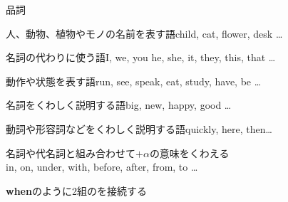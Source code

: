 \documentclass[aspectratio=169,xcolor={dvipsnames,table}]{beamer}
\begin{document}
\begin{frame}[plain,label=basic]{品詞}
 
\begin{description}
 \item[名詞] 人、動物、植物やモノの名前を表す語\hfill{\small child, cat, flower, desk \ldots}
  \item[代名詞] 名詞の代わりに使う語\hfill{\small I, we, you he, she, it, they, this, that \ldots}
 \item[動詞] 動作や状態を表す語\hfill{\small run, see, speak, eat, study, have, be \ldots{}}
 \item[形容詞] 名詞をくわしく説明する語\hfill{\small big, new, happy, good \ldots}
 \item[副詞] 動詞や形容詞などをくわしく説明する語\hfill{\small quickly, here, then\ldots}
 \item[前置詞] 名詞や代名詞と組み合わせて$+\alpha$の意味をくわえる\\
\hfill{\small in, on, under, with, before, after, from, to \ldots}
 \item<2>[接続詞] {\bfseries when}のように2組のを接続する
\end{description}

\end{frame}
\end{document}
